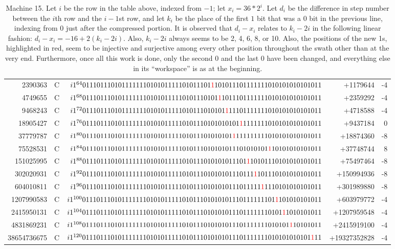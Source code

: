 \documentclass[12pt]{article}
\begin{document}
\begin{tiny}
\begin{table}[H]
{\begin{tabular}{rrrrr}
2390363&C&$i1^{64}011101110101111111010101111101011101{\textcolor{red}{1}}101011101111111010101010101011$&+1179644&-4\\
4749655&C&$i1^{68}01110111010111111101010111110101110101{\textcolor{red}{1}}1011101111111010101010101011$&+2359292&-4\\
9468243&C&$i1^{72}0111011101011111110101011111010111010101{\textcolor{red}{1}}11101111111010101010101011$&+4718588&-4\\
18905427&C&$i1^{76}01110111010111111101010111110101110101010101{\textcolor{red}{1}}1111111010101010101011$&+9437184&0\\
37779787&C&$i1^{80}011101110101111111010101111101011101010101{\textcolor{red}{1}}111111111010101010101011$&+18874360&-8\\
75528531&C&$i1^{84}0111011101011111110101011111010111010101011101010101{\textcolor{red}{1}}10101010101011$&+37748744&8\\
151025995&C&$i1^{88}0111011101011111110101011111010111010101011101{\textcolor{red}{1}}10101110101010101011$&+75497464&-8\\
302020931&C&$i1^{92}011101110101111111010101111101011101010101110111{\textcolor{red}{1}}101110101010101011$&+150994936&-8\\
604010811&C&$i1^{96}01110111010111111101010111110101110101010111011111{\textcolor{red}{1}}1110101010101011$&+301989880&-8\\
1207990583&C&$i1^{100}011101110101111111010101111101011101010101110111111101{\textcolor{red}{1}}101010101011$&+603979772&-4\\
2415950131&C&$i1^{104}01110111010111111101010111110101110101010111011111110101{\textcolor{red}{1}}1010101011$&+1207959548&-4\\
4831869231&C&$i1^{108}0111011101011111110101011111010111010101011101111111010101{\textcolor{red}{1}}10101011$&+2415919100&-4\\
38654736675&C&$i1^{120}0111011101011111110101011111010111010101011101111111010101010101{\textcolor{red}{1}}11$&+19327352828&-4\\
\end{tabular}}
\caption{\label{tab:15}Machine 15. Let $i$ be the row in the table above, indexed from $-1$; let $x_i=36*2^{i}.$ Let $d_i$ be the
difference in step number between the $i$th row and the $i-1$st row, and let $k_i$ be the place of the first $1$ bit that was a
$0$ bit in the previous line, indexing from 0 just after the compressed portion. It is observed that $d_i-x_i$ relates to $k_i-2i$
in the following linear fashion: $d_i-x_i=-16+2(k_i-2i).$ Also, $k_i-2i$ always seems to be 2, 4, 6, 8, or 10. Also, the positions of the new
1s, highlighted in red, seem to be injective and surjective among every other position throughout the swath other than at the very end.
Furthermore, once all this work is done, only the second 0 and the last 0 have been changed, and everything else in its ``workspace''
is as at the beginning.}
\end{table}
\end{tiny}
\end{document}
